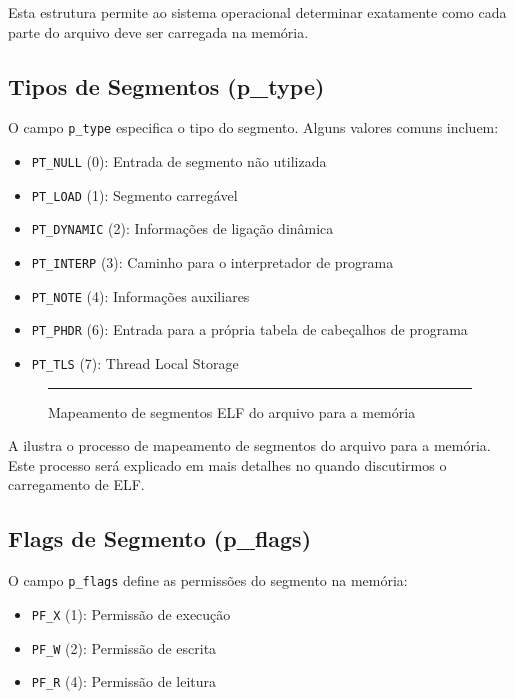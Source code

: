 Esta estrutura permite ao sistema operacional determinar exatamente como cada parte do arquivo deve ser carregada na memória.

\subsection{Tipos de Segmentos (p\_type)}\label{subsec:segment_types}

O campo \texttt{p\_type} especifica o tipo do segmento. Alguns valores comuns incluem:

\begin{itemize}
    \item \texttt{PT\_NULL} (0): Entrada de segmento não utilizada
    \item \texttt{PT\_LOAD} (1): Segmento carregável
    \item \texttt{PT\_DYNAMIC} (2): Informações de ligação dinâmica
    \item \texttt{PT\_INTERP} (3): Caminho para o interpretador de programa
    \item \texttt{PT\_NOTE} (4): Informações auxiliares
    \item \texttt{PT\_PHDR} (6): Entrada para a própria tabela de cabeçalhos de programa
    \item \texttt{PT\_TLS} (7): Thread Local Storage
\end{itemize}

\begin{figure}[ht]
    \centering
    \rule{10cm}{6cm} %
    \caption{Mapeamento de segmentos ELF do arquivo para a memória}
    \label{fig:segment_mapping}
\end{figure}

A  ilustra o processo de mapeamento de segmentos do arquivo para a memória. Este processo será explicado em mais detalhes no  quando discutirmos o carregamento de ELF.

\subsection{Flags de Segmento (p\_flags)}\label{subsec:segment_flags}

O campo \texttt{p\_flags} define as permissões do segmento na memória:

\begin{itemize}
    \item \texttt{PF\_X} (1): Permissão de execução
    \item \texttt{PF\_W} (2): Permissão de escrita 
    \item \texttt{PF\_R} (4): Permissão de leitura
\end{itemize}

